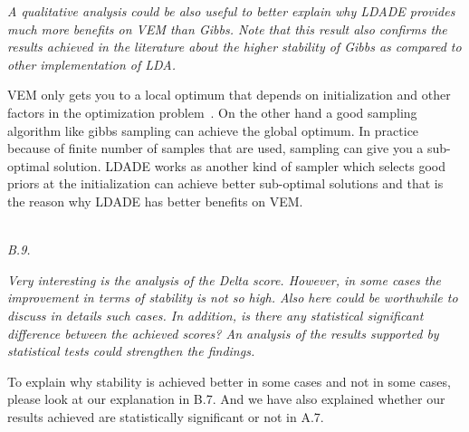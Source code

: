\documentclass[conference]{IEEEtran}
\begin{document}
\textit{A qualitative analysis could be also useful to better explain why LDADE provides much more benefits on VEM than Gibbs. Note that this result also confirms the results achieved in the literature about the higher stability of Gibbs as compared to other implementation of LDA.\\}

VEM only gets you to a local optimum that depends on initialization and other factors in the optimization problem~\cite{asuncion2009smoothing}. On the other hand a good sampling algorithm like gibbs sampling can achieve the global optimum. In practice because of finite number of samples that are used, sampling can give you a sub-optimal solution. LDADE works as another kind of sampler which selects good priors at the initialization can achieve better sub-optimal solutions and that is the reason why LDADE has better benefits on VEM.

\noindent
\textit{\\B.9.} 

\textit{Very interesting is the analysis of the Delta score. However, in some cases the improvement in terms of stability is not so high. Also here could be worthwhile to discuss in details such cases. In addition, is there any statistical significant difference between the achieved scores? An analysis of the results supported by statistical tests could strengthen the findings.\\}

To explain why stability is achieved better in some cases and not in some cases, please look at our explanation in B.7. And we have also explained whether our results achieved are statistically significant or not in A.7.


\medskip

\end{document}
